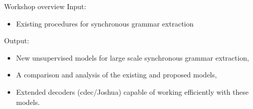 \documentclass{beamer}
\begin{document}
\begin{frame}[t]{Workshop overview}
Input:
  \begin{itemize}
  \item Existing procedures for synchronous grammar extraction
  \end{itemize}
\vspace{0.3in}
Output:
  \begin{itemize}
    \item New unsupervised models for large scale synchronous grammar extraction,
    \item A comparison and analysis of the existing and proposed models,
    \item Extended decoders (cdec/Joshua) capable of working efficiently with these models.
  \end{itemize}
\end{frame}
\end{document}
